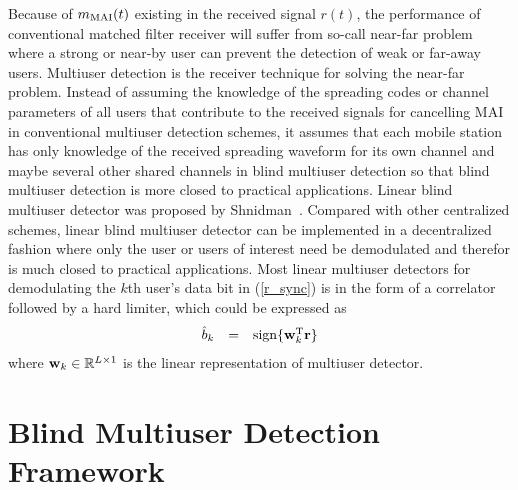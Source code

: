 \documentclass[a4paper,10pt,fleqn, twocolumn]{IEEETran}
\newcommand{\br}{{\mathbf r}}
\newcommand{\bw}{{\bf w}}
\begin{document}
Because of $m_{\rm MAI}(t)$ existing in the received signal
$r(t)$, the performance of conventional matched filter receiver
will suffer from so-call near-far problem where a strong or
near-by user can prevent the detection of weak or far-away users.
Multiuser detection is the receiver technique for solving the
near-far problem. Instead of assuming the knowledge of the
spreading codes or channel parameters of all users that contribute
to the received signals for cancelling MAI in conventional
multiuser detection schemes, it assumes that each mobile station
has only knowledge of the received spreading waveform for its own
channel and maybe several other shared channels in blind multiuser
detection so that blind multiuser detection is more closed to
practical applications. Linear blind multiuser detector was
proposed by Shnidman~\cite{Shni67}. Compared with other
centralized schemes, linear blind multiuser detector can be
implemented in a decentralized fashion where only the user or
users of interest need be demodulated and therefor is much closed
to practical applications. Most linear multiuser detectors for
demodulating the $k$th user's data bit in (\ref{r_sync}) is in the
form of a correlator followed by a hard limiter, which could be
expressed as
\begin{equation}
\begin{array}{rcl}
\hat{b}_k &=& \mbox{sign}\{\bw_k^{\rm T}\br\}
\end{array} \label{linear}
\end{equation}
\noindent where $\bw_k \in \mathbb{R}^{L\times 1}$ is the linear
representation of multiuser detector.

\section{Blind Multiuser Detection Framework\label{BMUD_model}}
\end{document}

